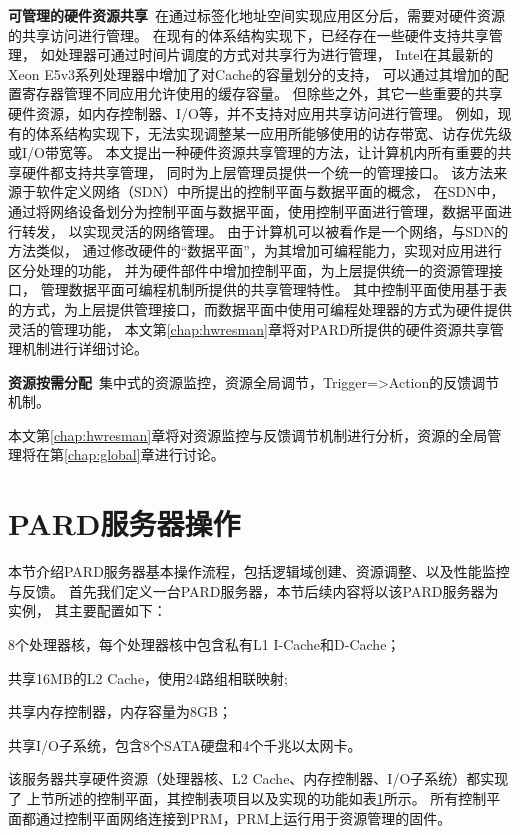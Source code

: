 \textbf{可管理的硬件资源共享}\ 在通过标签化地址空间实现应用区分后，需要对硬件资源的共享访问进行管理。
在现有的体系结构实现下，已经存在一些硬件支持共享管理，
如处理器可通过时间片调度的方式对共享行为进行管理，
Intel在其最新的Xeon E5v3系列处理器中增加了对Cache的容量划分的支持\cite{intel-cat}，
可以通过其增加的配置寄存器管理不同应用允许使用的缓存容量。
但除些之外，其它一些重要的共享硬件资源，如内存控制器、I/O等，并不支持对应用共享访问进行管理。
例如，现有的体系结构实现下，无法实现调整某一应用所能够使用的访存带宽、访存优先级或I/O带宽等。
本文提出一种硬件资源共享管理的方法，让计算机内所有重要的共享硬件都支持共享管理，
同时为上层管理员提供一个统一的管理接口。
该方法来源于软件定义网络（SDN）中所提出的控制平面与数据平面的概念，
在SDN中，通过将网络设备划分为控制平面与数据平面，使用控制平面进行管理，数据平面进行转发，
以实现灵活的网络管理。
由于计算机可以被看作是一个网络，与SDN的方法类似，
通过修改硬件的“数据平面”，为其增加可编程能力，实现对应用进行区分处理的功能，
并为硬件部件中增加控制平面，为上层提供统一的资源管理接口，
管理数据平面可编程机制所提供的共享管理特性。
其中控制平面使用基于表的方式，为上层提供管理接口，而数据平面中使用可编程处理器的方式为硬件提供灵活的管理功能，
本文第\ref{chap:hwresman}章将对PARD所提供的硬件资源共享管理机制进行详细讨论。


\textbf{资源按需分配}\ 集中式的资源监控，资源全局调节，Trigger=>Action的反馈调节机制。


本文第\ref{chap:hwresman}章将对资源监控与反馈调节机制进行分析，资源的全局管理将在第\ref{chap:global}章进行讨论。


\section{PARD服务器操作}

本节介绍PARD服务器基本操作流程，包括逻辑域创建、资源调整、以及性能监控与反馈。
首先我们定义一台PARD服务器，本节后续内容将以该PARD服务器为实例，
其主要配置如下：

8个处理器核，每个处理器核中包含私有L1 I-Cache和D-Cache；

共享16MB的L2 Cache，使用24路组相联映射;

共享内存控制器，内存容量为8GB；

共享I/O子系统，包含8个SATA硬盘和4个千兆以太网卡。

该服务器共享硬件资源（处理器核、L2 Cache、内存控制器、I/O子系统）都实现了
上节所述的控制平面，其控制表项目以及实现的功能如表\ref{}所示。
所有控制平面都通过控制平面网络连接到PRM，PRM上运行用于资源管理的固件。

